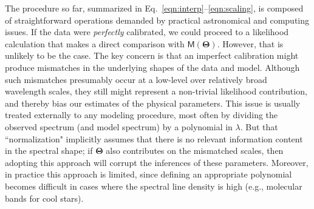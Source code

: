 \documentclass[iop,floatfix,twocolappendix]{emulateapj}
\newcommand{\vM}{\mathsf{M}}
\newcommand{\vT}{ {\bm \Theta}}
\begin{document}
The procedure so far, summarized in Eq.~\ref{eqn:interp}--\ref{eqn:scaling}, is composed of 
straightforward operations demanded by practical astronomical and computing issues.  If the data 
were {\it perfectly} calibrated, we could proceed to a likelihood calculation that makes a direct 
comparison with $\vM(\vT)$.  However, that is unlikely to be the case.  The key concern is that an 
imperfect calibration might produce mismatches in the underlying shapes of the data and model.  
Although such mismatches presumably occur at a low-level over relatively broad wavelength scales, 
they still might represent a non-trivial likelihood contribution, and thereby bias our estimates of 
the physical parameters.  This issue is usually treated externally to any modeling procedure, most 
often by dividing the observed spectrum (and model spectrum) by a polynomial in $\lambda$.  But 
that ``normalization" implicitly assumes that there is no relevant information content in the 
spectral shape; if $\vT$ also contributes on the mismatched scales, then adopting this approach 
will corrupt the inferences of these parameters.  Moreover, in practice this approach is limited, 
since defining an appropriate polynomial becomes difficult in cases where the spectral line density 
is high (e.g., molecular bands for cool stars).  
\end{document}
